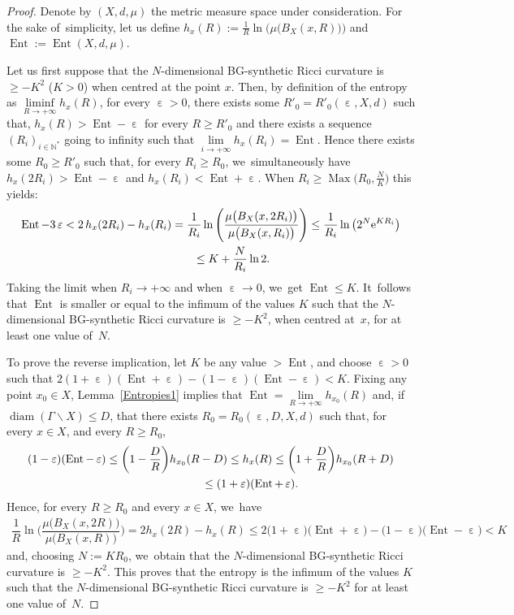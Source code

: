 \documentclass[pdftex]{sigma}
\numberwithin{equation}{section}
\newcommand{\N}{\mathbb{N}}
\newcommand{\f}{\rightarrow}
\newcommand{\Ent}{\operatorname{Ent}}
\newcommand{\Max}{\operatorname{Max}}
\newcommand{\diam}{\operatorname{diam}}
\newcommand{\e}{\operatorname{\varepsilon}}
\begin{document}
\begin{proof}
Denote by $ (X,d, \mu) $ the metric measure space under consideration. For the sake of~sim\-p\-li\-city, let us define $h_x (R) := \frac{1}{R}
\ln \big(\mu \big( B_X (x, R) \big)\big)$ and $\Ent := \Ent (X,d,\mu)$.

Let us first suppose that the $N$-dimensional BG-synthetic Ricci curvature is $\ge -K^2$ ($K> 0$) when centred at the point $x$. Then, by definition of the entropy as
$\liminf\limits_{R\to +\infty} h_x (R)$, for every $\e > 0$, there exists some $R'_0 = R'_0 (\e, X, d)$ such that, $ h_x(R) > \Ent - \e$ for every $R
\ge R'_0$
and there exists a sequence $(R_i)_{i \in \N^*}$ going to infinity such that $\lim\limits_{i \to +\infty} h_x(R_i) = \Ent $. Hence there exists some
$R_0 \ge R'_0$ such that, for every $R_i \ge R_0$, we~simultaneously have
$h_x (2 R_i) > \Ent - \e$ and $h_x(R_i) < \Ent + \e$.
When $R_i \ge \Max \big(R_0, \frac{N}{K} \big)$ this yields:
\begin{gather*}
\Ent - 3 \e < 2\, h_x(2 R_i) - h_x(R_i) = \dfrac{1}{R_i} \ln \Bigg(\frac{\mu \big(B_X (x, 2 R_i)\big)}{\mu \big( B_X (x, R_i) \big)} \Bigg) \le \dfrac{1}{R_i} \ln \big( 2^N {\rm e}^{K R_i}\big)
\\ \hphantom{\Ent - 3 \e }
{}\le K + \frac{N}{R_i} \ln 2.
\end{gather*}
Taking the limit when $R_i \f + \infty$ and when $\e \f 0$, we~get $\Ent
\le K$. It~follows that $\Ent $ is smaller or equal to the infimum
of the values $K$ such that the $N$-dimensional BG-synthetic Ricci curvature is $\ge -K^2$, when centred at~$x$, for at least one value of~$N$.

To prove the reverse implication, let $K$ be any value $> \Ent $, and choose $\e> 0$ such that
$ 2 (1+\e) (\Ent + \e) - (1-\e) (\Ent - \e) < K$. Fixing any point $x_0 \in X$,
Lemma~\ref{Entropies1} implies that $\Ent = \lim\limits_{R \to +\infty} h_{x_0}(R)$ and, if $\diam (\Gamma \backslash X) \le D$, that there exists
$R_0 = R_0 (\e, D, X, d)$ such that, for every $x \in X$, and every $R \ge R_0$,
\begin{gather*}
(1 - \e) (\Ent - \e) \le \bigg(1 - \frac{D}{R}\bigg) h_{x_0} (R-D) \le h_x (R) \le \bigg(1 + \frac{D}{R}\bigg) h_{x_0} (R+ D)
\\ \hphantom{(1 - \e) (\Ent - \e) }
{}\le (1 + \e)(\Ent +\e).
\end{gather*}
Hence, for every $R\ge R_0$ and every $ x \in X$, we~have
\begin{gather*}
\dfrac{1}{R} \ln\Bigg(\!\dfrac{\mu \big( B_X(x, 2 R)\big)}{\mu \big( B_X(x, R)\big)}\!\Bigg)\! = 2 h_x( 2 R) - h_x(R) \le 2 \big(1+\e\big) \big(\Ent + \e \big) - \big(1-\e\big) \big(\Ent - \e \big)\! < K
\end{gather*}
and, choosing $N := K R_0$, we~obtain that the $N$-dimensional BG-synthetic Ricci curvature is $\ge -K^2$.
This proves that the entropy is the infimum of the values $K$ such that the $N$-dimensional BG-synthetic Ricci curvature is $\ge -K^2$ for at least one value
of~$N$.


\end{proof}
\end{document}
